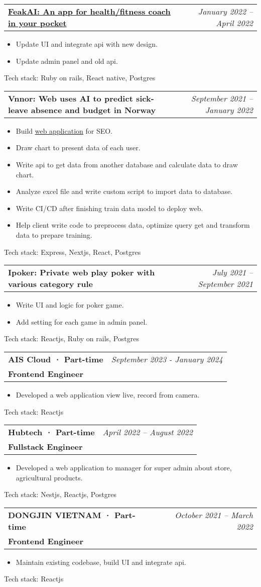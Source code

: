 \documentclass[letterpaper,11pt]{article}
\makeatletter
\newcommand{\resumeItem}[1]{
  \item\small{
    {#1 \vspace{-2pt}}
  }
}
\newcommand{\resumeSubheadingWithoutProject}[4]{
  \vspace{-2pt}\item
    \begin{tabular*}{0.97\textwidth}[t]{l@{\extracolsep{\fill}}r}
      \textbf{#1} & \textit{#2} \\
      \textbf{\small#3} & \textit{\small #4} \\
    \end{tabular*}\vspace{-7pt}
}
\newcommand{\resumeSubheadingProject}[2]{
  \vspace{-2pt}\item
    \begin{tabular*}{0.97\textwidth}[t]{l@{\extracolsep{\fill}}r}
      \textbf{\small#1} & \textit{\small #2} \\
    \end{tabular*}\vspace{-7pt}
}
\newcommand{\resumeSubheadingProjectWithLink}[4]{
  \vspace{-2pt}\item
    \begin{tabular*}{0.97\textwidth}[t]{l@{\extracolsep{\fill}}r}
      \href{#1}{\textbf{\underline{#2}:{#3}}} & \textit{\small #4} \\
    \end{tabular*}\vspace{-7pt}
}
\newcommand{\resumeLink}[2]{
  \href{#1}{\underline{#2}}
}
\newcommand{\resumeSubSubheading}[2]{
    \item
    \begin{tabular*}{0.97\textwidth}{l@{\extracolsep{\fill}}r}
      \textit{\small#1} & \textit{\small #2} \\
    \end{tabular*}\vspace{-7pt}
}
\newcommand{\resumeSubHeadingListEnd}{\end{itemize}}
\newcommand{\resumeItemListStart}{\begin{itemize}}
\newcommand{\resumeItemListEnd}{\end{itemize}\vspace{-5pt}}
\makeatother
\begin{document}
\resumeSubheadingProjectWithLink
{https://play.google.com/store/apps/details?id=ai.feak\&hl=en}
{FeakAI}
{ An app for health/fitness coach in your pocket}{January 2022 -- April 2022}
\resumeItemListStart
\resumeItem{ Update UI and integrate api with new design.}
\resumeItem{ Update admin panel and old api.}
\resumeItemListEnd
{Tech stack:}{ Ruby on rails, React native, Postgres}

\resumeSubheadingProject
{Vnnor: Web uses AI to predict sick-leave absence and budget in Norway}{September 2021 -- January 2022}
\resumeItemListStart
\resumeItem{ Build\resumeLink{https://www.synplan.ai/}{web application}for SEO.}
\resumeItem{ Draw chart to present data of each user.}
\resumeItem{ Write api to get data from another database and calculate data to draw chart.}
\resumeItem{ Analyze excel file and write custom script to import data to database.}
\resumeItem{ Write CI/CD after finishing train data model to deploy web.}
\resumeItem{ Help client write code to preprocess data, optimize query get and transform data to prepare training.}
\resumeItemListEnd
{Tech stack:}{ Express, Nextjs, React, Postgres}

\resumeSubheadingProject
{Ipoker: Private web play poker with various category rule}{July 2021 -- September 2021}
\resumeItemListStart
\resumeItem{ Write UI and logic for poker game.}
\resumeItem{ Add setting for each game in admin panel.}
\resumeItemListEnd
{Tech stack:}{ Reactjs, Ruby on rails, Postgres}


\resumeSubheadingWithoutProject
{AIS Cloud · Part-time}{September 2023 - January 2024}
{Frontend Engineer}{}
\resumeItemListStart
\resumeItem{Developed a web application view live, record from camera.}
\resumeItemListEnd
{Tech stack:}{ Reactjs }

\resumeSubheadingWithoutProject
{Hubtech · Part-time}{April 2022 -- August 2022}
{Fullstack Engineer}{}
\resumeItemListStart
\resumeItem{Developed a web application to manager for super admin about store, agricultural products.}
\resumeItemListEnd
{Tech stack:}{ Nestjs, Reactjs, Postgres}

\resumeSubheadingWithoutProject
{DONGJIN VIETNAM · Part-time}{October 2021 -- March 2022}
{Frontend Engineer}{}
\resumeItemListStart
\resumeItem{ Maintain existing codebase, build UI and integrate api.}
\resumeItemListEnd
{Tech stack:}{ Reactjs}
\end{document}
